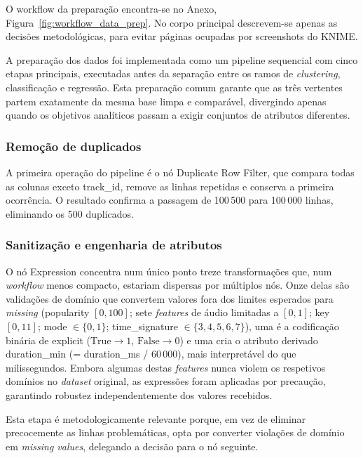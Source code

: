 \documentclass[11pt,a4paper]{article}
\newcommand{\code}[1]{{\ttfamily\hyphenchar\font=45\relax #1}}
\begin{document}
O workflow da preparação encontra-se no Anexo, Figura~\ref{fig:workflow_data_prep}. No corpo principal descrevem-se apenas as decisões metodológicas, para evitar páginas ocupadas por screenshots do KNIME.

A preparação dos dados foi implementada como um pipeline sequencial com cinco etapas principais, executadas antes da separação entre os ramos de \textit{clustering}, classificação e regressão. Esta preparação comum garante que as três vertentes partem exatamente da mesma base limpa e comparável, divergindo apenas quando os objetivos analíticos passam a exigir conjuntos de atributos diferentes.

\subsubsection{Remoção de duplicados}

A primeira operação do pipeline é o nó \code{Duplicate Row Filter}, que compara todas as colunas exceto \code{track\_id}, remove as linhas repetidas e conserva a primeira ocorrência. O resultado confirma a passagem de 100\,500 para 100\,000 linhas, eliminando os 500 duplicados.

\subsubsection{Sanitização e engenharia de atributos}

O nó \code{Expression} concentra num único ponto treze transformações que, num \textit{workflow} menos compacto, estariam dispersas por múltiplos nós. Onze delas são validações de domínio que convertem valores fora dos limites esperados para \textit{missing} (popularity $[0,100]$; sete \textit{features} de áudio limitadas a $[0,1]$; \code{key} $[0,11]$; \code{mode} $\in\{0,1\}$; \code{time\_signature} $\in\{3,4,5,6,7\}$), uma é a codificação binária de \code{explicit} ($\text{True}\rightarrow 1$, $\text{False}\rightarrow 0$) e uma cria o atributo derivado \code{duration\_min} (= \code{duration\_ms} / 60\,000), mais interpretável do que milissegundos. Embora algumas destas \textit{features} nunca violem os respetivos domínios no \textit{dataset} original, as expressões foram aplicadas por precaução, garantindo robustez independentemente dos valores recebidos.

Esta etapa é metodologicamente relevante porque, em vez de eliminar precocemente as linhas problemáticas, opta por converter violações de domínio em \textit{missing values}, delegando a decisão para o nó seguinte.
\end{document}
